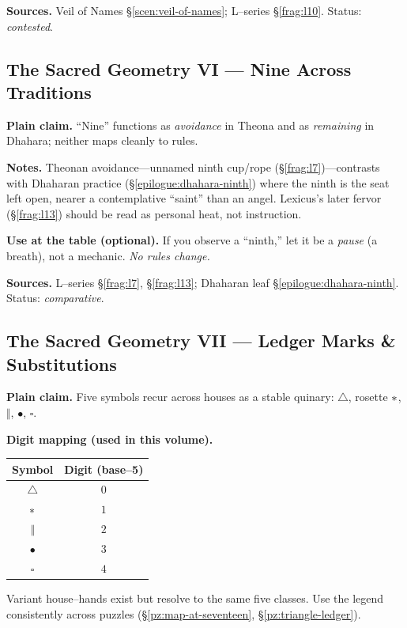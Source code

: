 \documentclass[11pt]{article}
\numberwithin{equation}{section} %
\theoremstyle{plain} %
\theoremstyle{definition} %
\theoremstyle{remark} %
\begin{document}
\medskip
\noindent\textbf{Sources.} Veil of Names \S\ref{scen:veil-of-names}; L–series \S\ref{frag:l10}. Status: \emph{contested}.

\subsection{The Sacred Geometry VI — Nine Across Traditions}
\label{geometry:nine}

\noindent\textbf{Plain claim.} “Nine” functions as \emph{avoidance} in Theona and as \emph{remaining} in Dhahara; neither maps cleanly to rules.

\medskip
\noindent\textbf{Notes.} Theonan avoidance—unnamed ninth cup/rope (\S\ref{frag:l7})—contrasts with Dhaharan practice (\S\ref{epilogue:dhahara-ninth}) where the ninth is the seat left open, nearer a contemplative “saint” than an angel. Lexicus’s later fervor (\S\ref{frag:l13}) should be read as personal heat, not instruction.

\medskip
\noindent\textbf{Use at the table (optional).} If you observe a “ninth,” let it be a \emph{pause} (a breath), not a mechanic. \emph{No rules change.}

\medskip
\noindent\textbf{Sources.} L–series \S\ref{frag:l7}, \S\ref{frag:l13}; Dhaharan leaf \S\ref{epilogue:dhahara-ninth}. Status: \emph{comparative}.

\subsection{The Sacred Geometry VII — Ledger Marks \& Substitutions}
\label{geometry:ledger-marks}

\noindent\textbf{Plain claim.} Five symbols recur across houses as a stable quinary: \(\triangle\), rosette \(\large\ast\), \(\Vert\), \(\bullet\), \(\square\).

\medskip
\noindent\textbf{Digit mapping (used in this volume).}
\begin{center}
\begin{tabular}{c|c}
\textbf{Symbol} & \textbf{Digit (base–5)} \\
\hline
\(\triangle\) & \(0\) \\
\(\large\ast\) & \(1\) \\
\(\Vert\) & \(2\) \\
\(\bullet\) & \(3\) \\
\(\square\) & \(4\) \\
\end{tabular}
\end{center}
Variant house–hands exist but resolve to the same five classes. Use the legend consistently across puzzles (\S\ref{pz:map-at-seventeen}, \S\ref{pz:triangle-ledger}).
\end{document}
